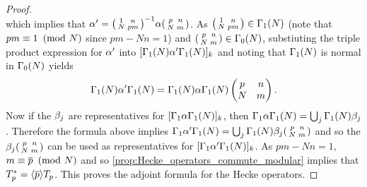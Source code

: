 \begin{proof}
\[        \]
        which implies that $\alpha' = \begin{psmallmatrix} 1 & n \\ N & pm \end{psmallmatrix}^{-1}\alpha\begin{psmallmatrix} p & n \\ N & m \end{psmallmatrix}$. As $\begin{psmallmatrix} 1 & n \\ N & pm \end{psmallmatrix} \in \Gamma_{1}(N)$ (note that $pm \equiv 1 \ \left(\text{mod }N\right)$ since $pm-Nn = 1$) and $\begin{psmallmatrix} p & n \\ N & m \end{psmallmatrix} \in \Gamma_{0}(N)$, substiuting the triple product expression for $\alpha'$ into $[\Gamma_{1}(N)\alpha'\Gamma_{1}(N)]_{k}$ and noting that $\Gamma_{1}(N)$ is normal in $\Gamma_{0}(N)$ yields
        \[
          \Gamma_{1}(N)\alpha'\Gamma_{1}(N) = \Gamma_{1}(N)\alpha\Gamma_{1}(N)\begin{pmatrix} p & n \\ N & m \end{pmatrix}.
        \]
        Now if the $\beta_{j}$ are representatives for $[\Gamma_{1}\alpha\Gamma_{1}(N)]_{k}$, then $\Gamma_{1}\alpha\Gamma_{1}(N) = \bigcup_{j}\Gamma_{1}(N)\beta_{j}$. Therefore the formula above implies $\Gamma_{1}\alpha'\Gamma_{1}(N) = \bigcup_{j}\Gamma_{1}(N)\beta_{j}\begin{psmallmatrix} p & n \\ N & m \end{psmallmatrix}$ and so the $\beta_{j}\begin{psmallmatrix} p & n \\ N & m \end{psmallmatrix}$ can be used as representatives for $[\Gamma_{1}\alpha'\Gamma_{1}(N)]_{k}$. As $pm-Nn = 1$, $m \equiv \overline{p} \ \left(\text{mod }N\right)$ and so \cref{prop:Hecke_operators_commute_modular} implies that $T_{p}^{\ast} = \langle\overline{p}\rangle T_{p}$. This proves the adjoint formula for the Hecke operators.
      \end{proof}

